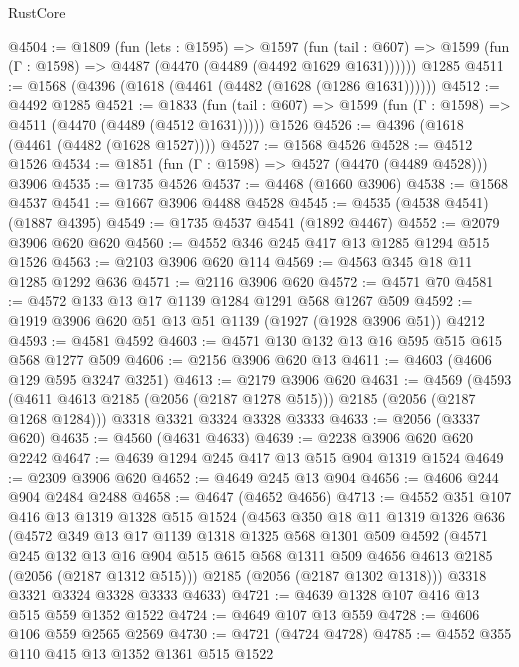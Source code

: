 \begin{lexlean}{RustCore}
\begin{coremodule}
@4504 := @1809
    (fun (lets : @1595) =>
    @1597
      (fun (tail : @607) => @1599 (fun (Γ : @1598) => @4487 (@4470 (@4489 (@4492 @1629 @1631))))))
    @1285
@4511 := @1568 (@4396 (@1618 (@4461 (@4482 (@1628 (@1286 @1631))))))
@4512 := @4492 @1285
@4521 := @1833
    (fun (tail : @607) => @1599 (fun (Γ : @1598) => @4511 (@4470 (@4489 (@4512 @1631)))))
    @1526
@4526 := @4396 (@1618 (@4461 (@4482 (@1628 @1527))))
@4527 := @1568 @4526
@4528 := @4512 @1526
@4534 := @1851 (fun (Γ : @1598) => @4527 (@4470 (@4489 @4528))) @3906
@4535 := @1735 @4526
@4537 := @4468 (@1660 @3906)
@4538 := @1568 @4537
@4541 := @1667 @3906 @4488 @4528
@4545 := @4535 (@4538 @4541) (@1887 @4395)
@4549 := @1735 @4537 @4541 (@1892 @4467)
@4552 := @2079 @3906 @620 @620
@4560 := @4552 @346 @245 @417 @13 @1285 @1294 @515 @1526
@4563 := @2103 @3906 @620 @114
@4569 := @4563 @345 @18 @11 @1285 @1292 @636
@4571 := @2116 @3906 @620
@4572 := @4571 @70
@4581 := @4572 @133 @13 @17 @1139 @1284 @1291 @568 @1267 @509
@4592 := @1919 @3906 @620 @51 @13 @51 @1139 (@1927 (@1928 @3906 @51)) @4212
@4593 := @4581 @4592
@4603 := @4571 @130 @132 @13 @16 @595 @515 @615 @568 @1277 @509
@4606 := @2156 @3906 @620 @13
@4611 := @4603 (@4606 @129 @595 @3247 @3251)
@4613 := @2179 @3906 @620
@4631 := @4569
    (@4593 (@4611 @4613 @2185 (@2056 (@2187 @1278 @515))) @2185 (@2056 (@2187 @1268 @1284)))
    @3318
    @3321
    @3324
    @3328
    @3333
@4633 := @2056 (@3337 @620)
@4635 := @4560 (@4631 @4633)
@4639 := @2238 @3906 @620 @620 @2242
@4647 := @4639 @1294 @245 @417 @13 @515 @904 @1319 @1524
@4649 := @2309 @3906 @620
@4652 := @4649 @245 @13 @904
@4656 := @4606 @244 @904 @2484 @2488
@4658 := @4647 (@4652 @4656)
@4713 := @4552
    @351
    @107
    @416
    @13
    @1319
    @1328
    @515
    @1524
    (@4563
      @350
      @18
      @11
      @1319
      @1326
      @636
      (@4572
        @349
        @13
        @17
        @1139
        @1318
        @1325
        @568
        @1301
        @509
        @4592
        (@4571
          @245
          @132
          @13
          @16
          @904
          @515
          @615
          @568
          @1311
          @509
          @4656
          @4613
          @2185
          (@2056 (@2187 @1312 @515)))
        @2185
        (@2056 (@2187 @1302 @1318)))
      @3318
      @3321
      @3324
      @3328
      @3333
      @4633)
@4721 := @4639 @1328 @107 @416 @13 @515 @559 @1352 @1522
@4724 := @4649 @107 @13 @559
@4728 := @4606 @106 @559 @2565 @2569
@4730 := @4721 (@4724 @4728)
@4785 := @4552
    @355
    @110
    @415
    @13
    @1352
    @1361
    @515
    @1522

\end{coremodule}
\end{lexlean}
